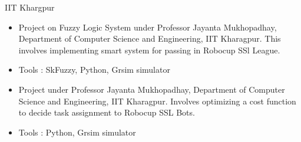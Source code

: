  { IIT Khargpur}
\begin{itemize}
\item Project on Fuzzy Logic System under Professor Jayanta Mukhopadhay, Department of Computer Science and Engineering, IIT Kharagpur. This involves implementing smart system for passing in Robocup SSl League.
\end{itemize}

\divider

\begin{itemize}
\item Tools : SkFuzzy, Python, Grsim simulator
\end{itemize}

\begin{itemize}
\item Project under Professor Jayanta Mukhopadhay, Department of Computer Science and Engineering, IIT Kharagpur. Involves optimizing a cost function to decide task assignment to Robocup SSL Bots.
\end{itemize}

\divider

\begin{itemize}
\item Tools : Python, Grsim simulator
\end{itemize}

